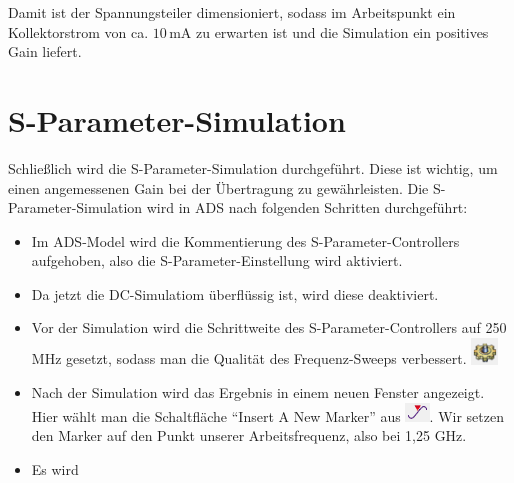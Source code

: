 Damit ist der Spannungsteiler dimensioniert, sodass im Arbeitspunkt ein Kollektorstrom von ca. $10\,\mathrm{mA}$ zu erwarten ist und die Simulation ein positives Gain liefert.
\section{S-Parameter-Simulation}
Schließlich wird die S-Parameter-Simulation durchgeführt. Diese ist wichtig, um einen angemessenen Gain bei der Übertragung zu gewährleisten.
Die S-Parameter-Simulation wird in \ac{ADS} nach folgenden Schritten durchgeführt:
\begin{itemize}
    \item Im ADS-Model wird die Kommentierung des S-Parameter-Controllers aufgehoben, also die S-Parameter-Einstellung wird aktiviert. 
    \item Da jetzt die DC-Simulatiom überflüssig ist, wird diese deaktiviert.
    \item Vor der Simulation wird die Schrittweite des S-Parameter-Controllers auf 250 MHz gesetzt, sodass man die Qualität des Frequenz-Sweeps verbessert.
    \includegraphics[height=0.7cm]{Pictures/simulate.png}
    \item Nach der Simulation wird das Ergebnis in einem neuen Fenster angezeigt. Hier wählt man die Schaltfläche \enquote{Insert A New Marker} aus \includegraphics[height=0.5cm]{Pictures/marker.png}.
    Wir setzen den Marker auf den Punkt unserer Arbeitsfrequenz, also bei 1{,}25 GHz.
    \item Es wird
\end{itemize}
\clearpage
